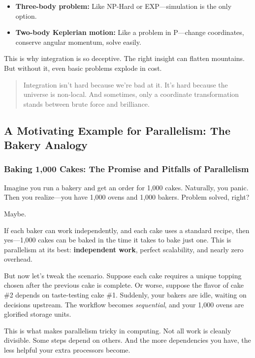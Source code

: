 \begin{itemize}
  \item \textbf{Three-body problem:} Like NP-Hard or EXP—simulation is the only option.
  \item \textbf{Two-body Keplerian motion:} Like a problem in P—change coordinates, conserve angular momentum, solve easily.
\end{itemize}

This is why integration is so deceptive. The right insight can flatten mountains. But without it, even basic problems explode in cost.

\begin{quote}
Integration isn’t hard because we’re bad at it. It’s hard because the universe is non-local. And sometimes, only a coordinate transformation stands between brute force and brilliance.
\end{quote}


\subsection{A Motivating Example for Parallelism: The Bakery Analogy}

\subsubsection{Baking 1,000 Cakes: The Promise and Pitfalls of Parallelism}

Imagine you run a bakery and get an order for 1,000 cakes. Naturally, you panic. Then you realize—you have 1,000 ovens and 1,000 bakers. Problem solved, right?

Maybe.

If each baker can work independently, and each cake uses a standard recipe, then yes—1,000 cakes can be baked in the time it takes to bake just one. This is parallelism at its best: \textbf{independent work}, perfect scalability, and nearly zero overhead.

But now let’s tweak the scenario. Suppose each cake requires a unique topping chosen after the previous cake is complete. Or worse, suppose the flavor of cake \#2 depends on taste-testing cake \#1. Suddenly, your bakers are idle, waiting on decisions upstream. The workflow becomes \textit{sequential}, and your 1,000 ovens are glorified storage units.

This is what makes parallelism tricky in computing. Not all work is cleanly divisible. Some steps depend on others. And the more dependencies you have, the less helpful your extra processors become.

